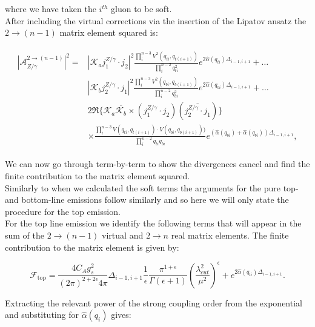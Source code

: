 		where we have taken the $i^{th}$ gluon to be soft.\\After including the virtual corrections
		via the insertion of the Lipatov ansatz the $2\rightarrow (n-1)$ matrix element squared is:

		\begin{align}
		\begin{split}
			|\mathcal{A}_{Z/\gamma}^{2\rightarrow (n-1)}|^2 = &\left|\mathcal{K}_a j_1^{Z/\gamma}\cdot j_2\right|^2
				\frac{\prod^{n-3}_{i}V^2(q_{ti}, q_{t(i+1)})}{\prod^{n-2}_{i}q^2_{ti}}e^{2\hat{\alpha}(q_{ti})\Delta_{i-1,i+1}} + \ldots \\
				&\left|\mathcal{K}_b j_2^{Z/\gamma}\cdot j_1\right|^2 \frac{\prod^{n-3}_{i}V^2(q_{bi}, q_{b(i+1)})}
				{\prod^{n-2}_{i}q^2_{bi}}e^{2\hat{\alpha}(q_{bi})\Delta_{i-1,i+1}} + \ldots \\
				&2\Re\{\mathcal{K}_a\overline{\mathcal{K}_b} \times (j_1^{Z/\gamma}\cdot j_2)(\overline{j_2^{Z/\gamma}\cdot j_1})\}\\
				&\times\frac{\prod^{n-3}_{i}V(q_{ti}, q_{t(i+1)})\cdot V(q_{bi}, q_{b(i+1)}))}{\prod^{n-2}_{i}q_{ti}q_{bi}}
				e^{(\hat{\alpha}(q_{bi}) + \hat{\alpha}(q_{bi}))\Delta_{i-1,i+1}},
		\end{split}
		\end{align}

		We can now go through term-by-term to show the divergences cancel and find the finite contribution to
		the matrix element squared.\\Similarly to when we calculated the soft terms the arguments for the pure
		top- and bottom-line emissions follow similarly and so here we will only state the procedure for
		the top emission.\\For the top line emission we identify the following terms that will appear in the
		sum of the $2\rightarrow (n-1)$ virtual and $2\rightarrow n$ real matrix elements.  The finite
		contribution to the matrix element is given by:

		\begin{equation}
			\mathcal{F}_{\text{top}} = \frac{4C_Ag_s^2}{(2\pi)^{2+2\epsilon}4\pi}\Delta_{i-1, i+1}
			\frac{1}{\epsilon}\frac{\pi^{1+\epsilon}}
			{\Gamma(\epsilon+1)}\left(\frac{\lambda_{cut}^2}{\mu^2}\right)^\epsilon +
			e^{2\hat{\alpha}(q_{ti})\Delta_{i-1,i+1}}.
		\end{equation}

		Extracting the relevant power of the strong coupling order from the
		exponential and substituting for $\hat{\alpha}(q_i)$ gives:

